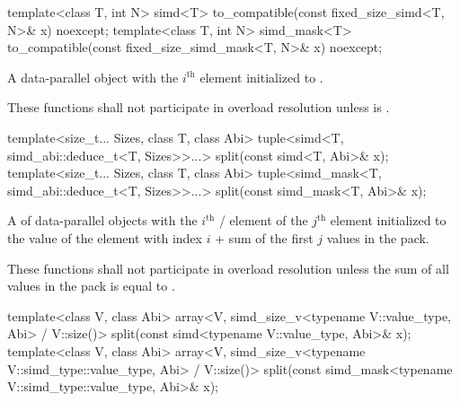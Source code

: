 \begin{itemdecl}
template<class T, int N> simd<T> to_compatible(const fixed_size_simd<T, N>& x) noexcept;
template<class T, int N> simd_mask<T> to_compatible(const fixed_size_simd_mask<T, N>& x) noexcept;
\end{itemdecl}

\begin{itemdescr}
  \pnum\returns
  A data-parallel object with the $i^\text{th}$ element initialized to  \foralli.

  \pnum\remarks
  These functions shall not participate in overload resolution unless  is .
\end{itemdescr}

\begin{itemdecl}
template<size_t... Sizes, class T, class Abi>
  tuple<simd<T, simd_abi::deduce_t<T, Sizes>>...>
    split(const simd<T, Abi>& x);
template<size_t... Sizes, class T, class Abi>
  tuple<simd_mask<T, simd_abi::deduce_t<T, Sizes>>...>
    split(const simd_mask<T, Abi>& x);
\end{itemdecl}

\begin{itemdescr}
  \pnum\returns
  A  of data-parallel objects with the $i^\text{th}$ / element of the $j^\text{th}$  element initialized to the value of the element  with index $i$ + sum of the first $j$ values in the  pack.

  \pnum\remarks
  These functions shall not participate in overload resolution unless the sum of all values in the  pack is equal to .
\end{itemdescr}

\begin{itemdecl}
template<class V, class Abi>
  array<V, simd_size_v<typename V::value_type, Abi> / V::size()>
    split(const simd<typename V::value_type, Abi>& x);
template<class V, class Abi>
  array<V, simd_size_v<typename V::simd_type::value_type, Abi> / V::size()>
    split(const simd_mask<typename V::simd_type::value_type, Abi>& x);
\end{itemdecl}

